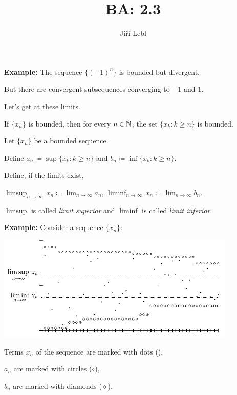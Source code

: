 \documentclass[10pt,aspectratio=149]{beamer}
\author{Ji\v{r}\'i Lebl}
\institute[OSU]{%
Departemento pri Matematiko de Oklahoma {\^S}tata Universitato}
\title{BA: 2.3}
\date{}
\begin{document}
\begin{frame}
\titlepage
\end{frame}

\begin{frame}
\textbf{Example:} 
The sequence $\{ {(-1)}^n \}$ is bounded but divergent.

\pause
But there are convergent subsequences converging to $-1$ and $1$.

\pause
Let's get at these limits.

\medskip
\pause

If $\{ x_n \}$ is bounded, then for every $n \in {\mathbb{N}}$, the set $\{ x_k : k \geq n \}$
is bounded.

\pause

\begin{definition}
Let $\{ x_n \}$ be a bounded sequence.

\medskip
\pause

Define
$a_n \coloneqq \sup \{ x_k : k \geq n \}$ and
$b_n \coloneqq \inf \{ x_k : k \geq n \}$.  

\medskip
\pause

Define, if the limits exist,

\medskip

\quad
$\displaystyle
\limsup_{n \to \infty} \, x_n \coloneqq \lim_{n \to \infty} a_n$,
\qquad
$\displaystyle
\liminf_{n \to \infty} \, x_n \coloneqq \lim_{n \to \infty} b_n$.
\end{definition}

\pause

$\limsup$ is called \emph{limit superior} and
$\liminf$ is called \emph{limit inferior}.

\end{frame}

\begin{frame}

\textbf{Example:}
Consider a sequence $\{x_n\}$:

\medskip

\includegraphics[width=4.5in]{../figures/sequence-limsupliminf_an_bn}

\medskip

Terms $x_n$ of the sequence are marked with dots (\raisebox{0.25ex}{\tiny$\bullet$}),

$a_n$ are marked with circles ($\circ$),

$b_n$ are marked with diamonds ($\diamond$).

\end{frame}
\end{document}
